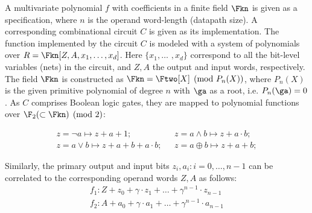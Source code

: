 A multivariate polynomial $f$ with coefficients in a finite field
$\Fkn$ is given as a specification, where $n$ is the operand
word-length (datapath size). A corresponding combinational
circuit $C$ is given as its implementation. 
The function implemented by the circuit $C$ is modeled with a system of polynomials over 
$R=\Fkn[Z,A,x_1,\dots,x_d]$. Here $\{x_1, \dots$ $, x_d\}$ correspond 
to all the bit-level variables (nets) in the circuit, and $Z,A$ the 
output and input words, respectively.  The field $\Fkn$ is constructed
as $\Fkn = \Ftwo[X]\pmod{P_n(X)}$, where $P_n(X)$ is the given
primitive polynomial of degree $n$
with $\ga$ as a root, i.e. $P_n(\ga) =0$. 
As $C$ comprises Boolean logic gates, they are
mapped to polynomial functions over $\F_2 (\subset \Fkn) \pmod 2$: 
\vspace{-0.15in}

\begin{small} 
\begin{equation}
\label{bool2poly}
\begin{split}
z =  \neg a \mapsto z+a+1;~~~& z =  a \wedge b \mapsto z+a \cdot b;\\
z =  a \vee b \mapsto z+a+b+a \cdot b;~~~& z =  a \oplus b \mapsto z+a+b;
\end{split}
\end{equation}
\end{small}
\vspace{-0.15in}

Similarly, the primary output and input bits $z_i, a_i: i=0,\dots,n-1$ 
can be correlated to the corresponding operand words $Z,A$ as follows:
\vspace{-0.08in}
\begin{equation}
\label{ip-word-level}
\begin{split}
 f_1: Z + z_0 +\gamma \cdot  z_1 + \dots +\gamma^{n-1} \cdot z_{n-1}\\
 f_2: A + a_0 +\gamma \cdot a_1 + \dots +\gamma^{n-1} \cdot a_{n-1}
\end{split}
\end{equation}

